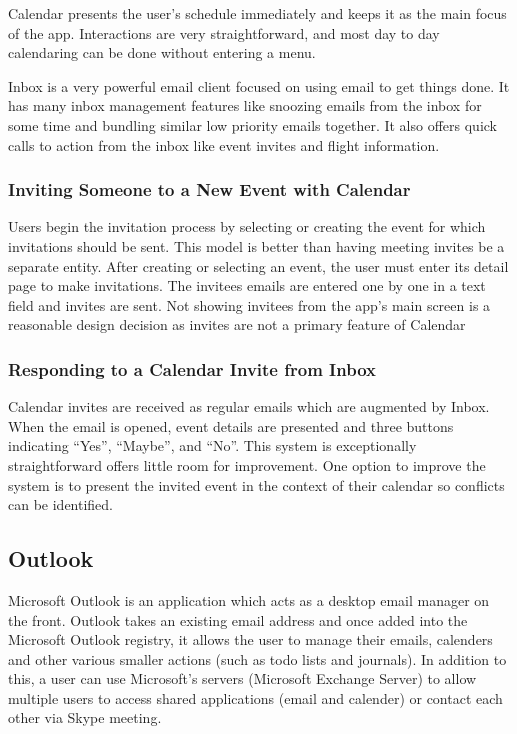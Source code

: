 \documentclass{sigchi}
\begin{document}
Calendar presents the user's schedule immediately and keeps it as the main focus of the app.
Interactions are very straightforward, and most day to day calendaring can be done without entering a menu.

Inbox is a very powerful email client focused on using email to get things done.
It has many inbox management features like snoozing emails from the inbox for some time and bundling similar low priority emails together.
It also offers quick calls to action from the inbox like event invites and flight information.

\subsubsection{Inviting Someone to a New Event with Calendar}
Users begin the invitation process by selecting or creating the event for which invitations should be sent.
This model is better than having meeting invites be a separate entity.
After creating or selecting an event, the user must enter its detail page to make invitations.
The invitees emails are entered one by one in a text field and invites are sent.
Not showing invitees from the app's main screen is a reasonable design decision as invites are not a primary feature of Calendar

\subsubsection{Responding to a Calendar Invite from Inbox}
Calendar invites are received as regular emails which are augmented by Inbox.
When the email is opened, event details are presented and three buttons indicating ``Yes'', ``Maybe'', and ``No''.
This system is exceptionally straightforward offers little room for improvement.
One option to improve the system is to present the invited event in the context of their calendar so conflicts can be identified.

\subsection{Outlook}

Microsoft Outlook is an application which acts as a desktop email manager on the front. 
Outlook takes an existing email address and once added into the Microsoft Outlook registry, it allows the user to manage their emails, calenders and other various smaller actions (such as todo lists and journals). 
In addition to this, a user can use Microsoft's servers (Microsoft Exchange Server) to allow multiple users to access shared applications (email and calender) or contact each other via Skype meeting.
\end{document}
